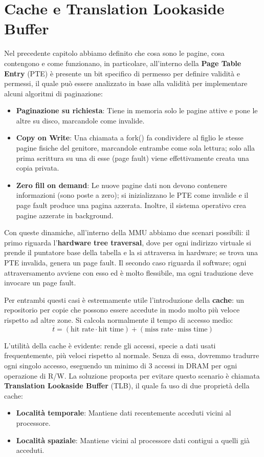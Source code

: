 \section{Cache e Translation Lookaside Buffer}
Nel precedente capitolo abbiamo definito che cosa sono le pagine, cosa contengono e come funzionano, in particolare, all'interno della \textbf{Page
Table Entry} (PTE) è presente un bit specifico di permesso per definire validità e permessi, il quale può essere analizzato in base alla validità per
implementare alcuni algoritmi di paginazione: \begin{itemize}
    \item \textbf{Paginazione su richiesta}: Tiene in memoria solo le pagine attive e pone le altre su disco, marcandole come invalide.
    \item \textbf{Copy on Write}: Una chiamata a fork() fa condividere al figlio le stesse pagine fisiche del genitore, marcandole entrambe come sola 
    lettura; solo alla prima scrittura su una di esse (page fault) viene effettivamente creata una copia privata.
    \item \textbf{Zero fill on demand}: Le nuove pagine dati non devono contenere informazioni (sono poste a zero); si inizializzano le PTE come
    invalide e il page fault produce una pagina azzerata. Inoltre, il sistema operativo crea pagine azzerate in background.
\end{itemize}

\noindent Con queste dinamiche, all'interno della MMU abbiamo due scenari possibili: il primo riguarda l'\textbf{hardware tree traversal}, dove per ogni
indirizzo virtuale si prende il puntatore base della tabella e la si attraversa in hardware; se trova una PTE invalida, genera un page fault. Il secondo
caso riguarda il software; ogni attraversamento avviene con esso ed è molto flessibile, ma ogni traduzione deve invocare un page fault.\par
Per entrambi questi casi è estremamente utile l'introduzione della \textbf{cache}: un repositorio per copie che possono essere accedute in modo molto
più veloce rispetto ad altre zone. Si calcola normalmente il tempo di accesso medio: \[
    \overline{t} = (\text{hit rate} \cdot \text{hit time}) + (\text{miss rate}\cdot \text{miss time})
\]

\noindent L'utilità della cache è evidente: rende gli accessi, specie a dati usati frequentemente, più veloci rispetto al normale. Senza di essa,
dovremmo tradurre ogni singolo accesso, eseguendo un minimo di 3 accessi in DRAM per ogni operazione di R/W. La soluzione proposta per evitare questo
scenario è chiamata \textbf{Translation Lookaside Buffer} (TLB), il quale fa uso di due proprietà della cache: \begin{itemize}
    \item \textbf{Località temporale}: Mantiene dati recentemente acceduti vicini al processore.
    \item \textbf{Località spaziale}: Mantiene vicini al processore dati contigui a quelli già acceduti.
\end{itemize}

